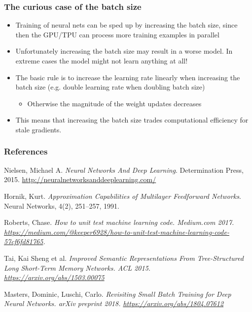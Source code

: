\documentclass{beamer}
\begin{document}
  \begin{frame}
    \frametitle{The curious case of the batch size}  
  
  \begin{itemize}
  	\item Training of neural nets can be sped up by increasing the batch size, since then the GPU/TPU can process more training examples in parallel
  	\item Unfortunately increasing the batch size may result in a worse model. In extreme cases the model might not learn anything at all! \cite{masters}
  	\item The basic rule is to increase the learning rate linearly when increasing the batch size (e.g. double learning rate when doubling batch size)
	\begin{itemize}
		\item Otherwise the magnitude of the weight updates decreases
    \end{itemize}
    \item This means that increasing the batch size trades computational efficiency for stale gradients.  	
  \end{itemize}

  \end{frame}  


%   
   \begin{frame}[allowframebreaks]
   	\frametitle{References}
   	\begin{thebibliography}{Hornik, 1991}

   Nielsen, Michael A. {\em Neural Networks And Deep Learning}. Determination Press, 2015. \url{http://neuralnetworksanddeeplearning.com/}
  
   Hornik, Kurt. {\em Approximation Capabilities of Multilayer Feedforward Networks}. Neural Networks, 4(2), 251--257, 1991.
  
   Roberts, Chase. \em{How to unit test machine learning code.} Medium.com 2017. \url{https://medium.com/@keeper6928/how-to-unit-test-machine-learning-code-57cf6fd81765}.
  
   Tai, Kai Sheng et al. \em{Improved Semantic Representations From Tree-Structured Long Short-Term Memory Networks.} ACL 2015. \url{https://arxiv.org/abs/1503.00075}
   
   Masters, Dominic, Luschi, Carlo. \em{Revisiting Small Batch Training for Deep Neural Networks.} arXiv preprint 2018. \url{https://arxiv.org/abs/1804.07612}
   
	\end{thebibliography}   
   \end{frame}  
\end{document}
